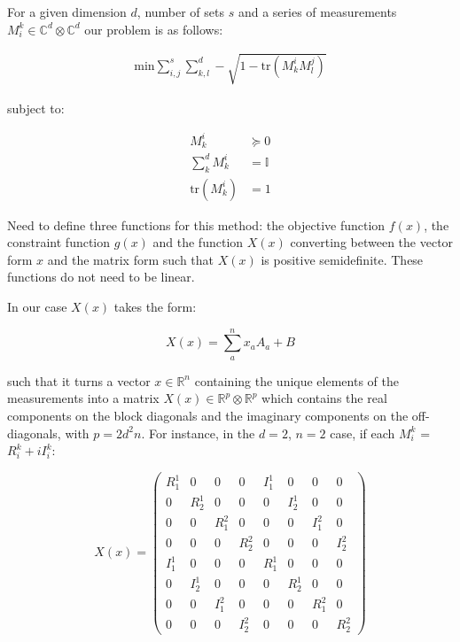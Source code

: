 \documentclass{article}
\begin{document}
For a given dimension $d$, number of sets $s$ and a series of measurements $M_i^k \in \mathbb{C}^d \otimes \mathbb{C}^d$ our problem is as follows:

\begin{align}
	\text{min} \sum_{i,j}^s \sum_{k,l}^d -\sqrt{1-\text{tr}(M_k^i M_l^j)} 
\end{align}

subject to:

\begin{align}
	M_k^i &\succeq 0 \\
	\sum_k^d M_k^i &= \mathbb{I} \\
	\text{tr}(M_k^i) &= 1
\end{align}

Need to define three functions for this method: the objective function $f(x)$, the constraint function $g(x)$ and the function $X(x)$ converting between the vector form $x$ and the matrix form such that $X(x)$ is positive semidefinite. These functions do not need to be linear.

In our case $X(x)$ takes the form:

\begin{equation}
	X(x) = \sum_a^n x_a A_a + B
\end{equation}

such that it turns a vector $x \in \mathbb{R}^n$ containing the unique elements of the measurements into a matrix $X(x) \in \mathbb{R}^p \otimes \mathbb{R}^p$ which contains the real components on the block diagonals and the imaginary components on the off-diagonals, with $p=2d^2n$. For instance, in the $d=2$, $n=2$ case, if each $M_i^k$ = $R_i^k + iI_i^k$:

\begin{equation}
	X(x) = 
	\begin{pmatrix}
		R_1^1 & 0 & 0 & 0 & I_1^1 & 0 & 0 & 0 \\
		0 & R_2^1 & 0 & 0 & 0 & I_2^1 & 0 & 0 \\
		0 & 0 & R_1^2 & 0 & 0 & 0 & I_1^2 & 0 \\
		0 & 0 & 0 & R_2^2 & 0 & 0 & 0 & I_2^2 \\
		I_1^1 & 0 & 0 & 0 & R_1^1 & 0 & 0 & 0 \\
		0 & I_2^1 & 0 & 0 & 0 & R_2^1 & 0 & 0 \\
		0 & 0 & I_1^2 & 0 & 0 & 0 & R_1^2 & 0 \\
		0 & 0 & 0 & I_2^2 & 0 & 0 & 0 & R_2^2
	\end{pmatrix}
\end{equation}
\end{document}
